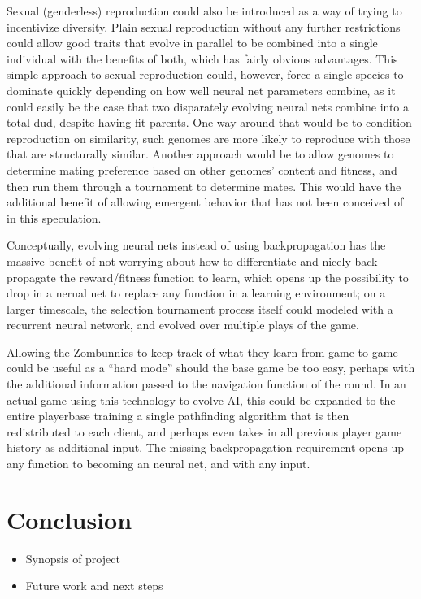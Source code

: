 \documentclass[letterpaper]{article}
\begin{document}
Sexual (genderless) reproduction could also be introduced as a way of trying to
incentivize diversity. Plain sexual reproduction without any further restrictions
could allow good traits that evolve in parallel to be combined into a single
individual with the benefits of both, which has fairly obvious advantages.
This simple approach to sexual reproduction could, however, force a single
species to dominate quickly depending on how well neural net parameters combine,
as it could easily be the case that two disparately evolving neural nets combine
into a total dud, despite having fit parents. One way around that would be to
condition reproduction on similarity, such genomes are more likely to reproduce
with those that are structurally similar. Another approach would be to allow
genomes to determine mating preference based on other genomes' content and
fitness, and then run them through a tournament to determine mates. This would
have the additional benefit of allowing emergent behavior that has not been
conceived of in this speculation.

Conceptually, evolving neural nets instead of using backpropagation
has the massive benefit of not worrying about how to differentiate and nicely
back-propagate the reward/fitness function to learn, which opens up the
possibility to drop in a nerual net to replace any function in a learning
environment; on a larger timescale, the selection tournament process itself
could modeled with a recurrent neural network, and evolved over multiple plays
of the game.

Allowing the Zombunnies to keep track of what they learn from game to game could
be useful as a ``hard mode'' should the base game be too easy, perhaps with the
additional information passed to the navigation function of the round. In an actual game
using this technology to evolve AI, this could be expanded to the entire
playerbase training a single pathfinding algorithm that is then redistributed to
each client, and perhaps even takes in all previous player game history as
additional input. The missing backpropagation requirement opens up
any function to becoming an neural net, and with any input.

\section{Conclusion}
\begin{itemize}
    \item Synopsis of project
    \item Future work and next steps
\end{itemize}
\end{document}
